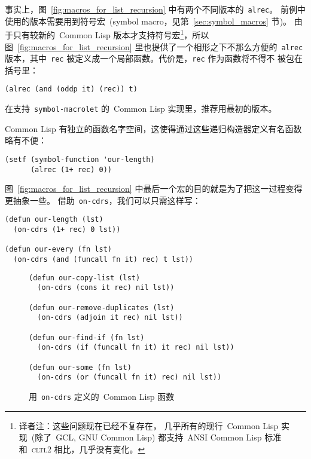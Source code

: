 事实上，图~\ref{fig:macros_for_list_recursion} 中有两个不同版本的~\texttt{alrec}。
前例中使用的版本需要用到符号宏~(symbol macro，见第~\ref{sec:symbol_macros} 节)。
由于只有较新的~Common Lisp 版本才支持符号宏\footnote{译者注：这些问题现在已经不复存在，
几乎所有的现行~Common Lisp 实现~(除了~GCL, GNU Common Lisp) 都支持~ANSI Common
Lisp 标准\pozhehao{}和~\textsc{cltl}2 相比，几乎没有变化。}，所以
图~\ref{fig:macros_for_list_recursion} 里也提供了一个相形之下不那么方便的~\texttt{alrec}
版本，其中~\texttt{rec} 被定义成一个局部函数。代价是，\texttt{rec} 作为函数将不得不
被包在括号里：
\begin{lstlisting}
(alrec (and (oddp it) (rec)) t)
\end{lstlisting}
在支持~\texttt{symbol-macrolet} 的~Common Lisp 实现里，推荐用最初的版本。

Common Lisp 有独立的函数名字空间，这使得通过这些递归构造器定义有名函数略有不便：
\begin{lstlisting}
(setf (symbol-function 'our-length)
      (alrec (1+ rec) 0))
\end{lstlisting}
图~\ref{fig:macros_for_list_recursion} 中最后一个宏的目的就是为了把这一过程变得更抽象一些。
借助~\texttt{on-cdrs}，我们可以只需这样写：
\begin{lstlisting}
(defun our-length (lst)
  (on-cdrs (1+ rec) 0 lst))

(defun our-every (fn lst)
  (on-cdrs (and (funcall fn it) rec) t lst))
\end{lstlisting}

\begin{figure}
\begin{lstlisting}
(defun our-copy-list (lst)
  (on-cdrs (cons it rec) nil lst))

(defun our-remove-duplicates (lst)
  (on-cdrs (adjoin it rec) nil lst))

(defun our-find-if (fn lst)
  (on-cdrs (if (funcall fn it) it rec) nil lst))

(defun our-some (fn lst)
  (on-cdrs (or (funcall fn it) rec) nil lst))
\end{lstlisting}
  \caption{用~\texttt{on-cdrs} 定义的~Common Lisp 函数}
  \label{fig:common_lisp_functions_defined_with_on-cdrs}
\end{figure}


